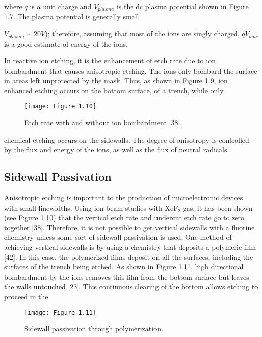 \noindent where $q$ is a unit charge and $V_{plasma}$ is the dc plasma potential shown in Figure 1.7. The plasma potential is generally small {$V_{plasma} \sim 20V$); therefore, assuming that most of the ions are singly charged, $qV_{bias}$ is a good estimate of energy of the ions.
	
In reactive ion etching, it is the enhancement of etch rate due to ion bombardment that causes anisotropic etching. The ions only bombard the surface in areas left unprotected by the mask. Thus, as shown in Figure 1.9, ion enhanced etching occurs on the bottom surface, of a trench, while only
	
	\begin{figure}[H]
		\centering
		\texttt{[image: Figure 1.10]}
		\bf\caption{ Etch rate with and without ion bombardment [38].}
		\label{fig:1.10}
	\end{figure}
	
\noindent chemical etching occurs on the sidewalls. The degree of anisotropy is controlled by the flux and energy of the ions, as well as the flux of neutral radicals.
	
\subsection{Sidewall Passivation}
	
\tab Anisotropic etching is important to the production of microelectronic devices with small linewidths. Using ion beam studies with $\text{XeF}_{2}$ gas, it has been shown (see Figure 1.10) that the vertical etch rate and undercut etch rate go to zero together [38]. Therefore, it is not possible to get vertical sidewalls with a fluorine chemistry unless some sort of sidewall passivation is used. One method of achieving vertical sidewalls is by using a chemistry that deposits a polymeric film [42]. In this case, the polymerized films deposit on all the surfaces, including the surfaces of the trench being etched. As shown in Figure 1.11, high directional bombardment by the ions removes this film from the bottom surface but leaves the walls untouched [23]. This continuous clearing of the bottom allows etching to proceed in the
	
	
	\begin{figure}[H]
		\centering
		\texttt{[image: Figure 1.11]}
		\bf\caption{ Sidewall passivation through polymerization.}
		\label{fig:1.11}
	\end{figure}
	
}
